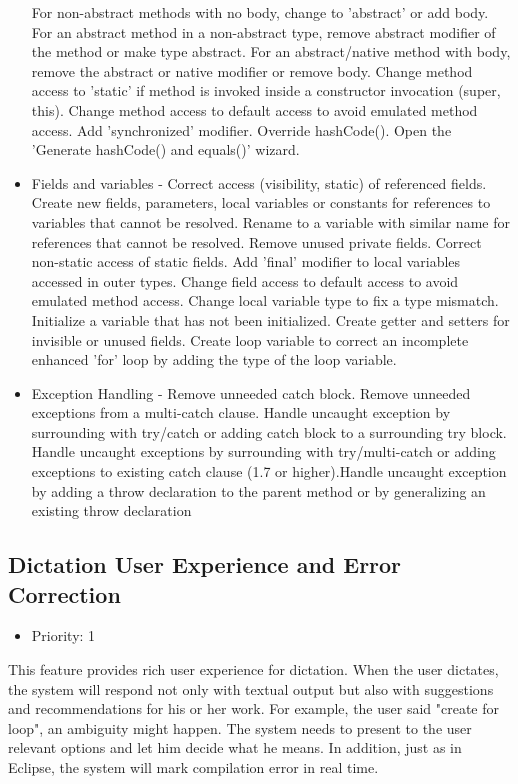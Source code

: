 \begin{itemize}
	For non-abstract methods with no body, change to 'abstract' or add body. For an abstract method in a non-abstract type, remove abstract modifier of the method or make type abstract. For an abstract/native method with body, remove the abstract or native modifier or remove body. Change method access to 'static' if method is invoked inside a constructor invocation (super, this). Change method access to default access to avoid emulated method access.  Add 'synchronized' modifier. Override hashCode(). Open the 'Generate hashCode() and equals()' wizard.
	\item Fields and variables - Correct access (visibility, static) of referenced fields. Create new fields, parameters, local variables or constants for references to variables that cannot be resolved. Rename to a variable with similar name for references that cannot be resolved. Remove unused private fields. Correct non-static access of static fields. Add 'final' modifier to local variables accessed in outer types. Change field access to default access to avoid emulated method access. Change local variable type to fix a type mismatch. Initialize a variable that has not been initialized. Create getter and setters for invisible or unused fields. Create loop variable to correct an incomplete enhanced 'for' loop by adding the type of the loop variable.
	\item Exception Handling - Remove unneeded catch block. Remove unneeded exceptions from a multi-catch clause. Handle uncaught exception by surrounding with try/catch or adding catch block to a surrounding try block. Handle uncaught exceptions by surrounding with try/multi-catch or adding exceptions to existing catch clause (1.7 or higher).Handle uncaught exception by adding a throw declaration to the parent method or by generalizing an existing throw declaration
\end{itemize}
\subsection{Dictation User Experience and Error Correction}
\begin{itemize}
	\item Priority: 1
\end{itemize}
This feature provides rich user experience for dictation. When the user dictates, the system will respond not only with textual output but also with suggestions and recommendations for his or her work. For example, the user said "create for loop", an ambiguity might happen. The system needs to present to the user relevant options and let him decide what he means. In addition, just as in Eclipse, the system will mark compilation error in real time.
